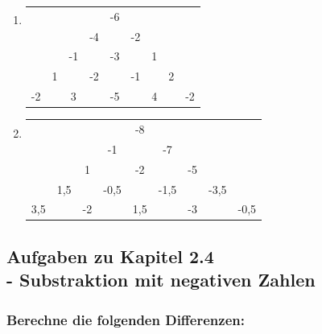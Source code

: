 \documentclass[a4paper,10pt]{article} %
\begin{document}
\begin{enumerate}[label=\alph*)]

  \item %
  \vspace{1cm}
  \begin{center}
    \begin{tabular}{c c c c c c c c c}
      & & & & -6 & & & & \\
      & & & -4 & & -2 & & & \\
      & & -1 & & -3 & & 1 & & \\
      & 1 & & -2 & & -1 & & 2 & \\
      -2 & & 3 & & -5 & & 4 & & -2 \\
    \end{tabular}
  \end{center}

  \item %
  \vspace{1cm}
  \begin{center}
    \begin{tabular}{c c c c c c c c c}
      & & & & -8 & & & & \\
      & & & -1 & & -7 & & & \\
      & & 1 & & -2 & & -5 & \\
      & 1,5 & & -0,5 & & -1,5 & & -3,5 & \\
      3,5 & & -2 & & 1,5 & & -3 & & -0,5 \\
    \end{tabular}
  \end{center}

\end{enumerate}
\vspace{1cm}

\subsection{Aufgaben zu Kapitel 2.4 \\
  - Substraktion mit negativen Zahlen}

\subsubsection{Berechne die folgenden Differenzen:} %
\end{document}
